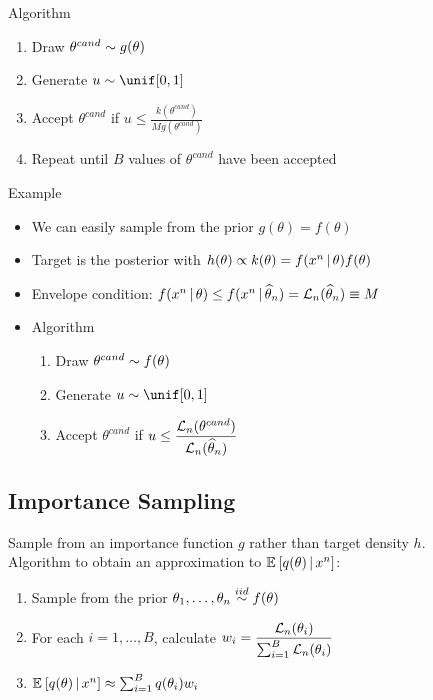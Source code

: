 \documentclass[landscape]{article}
\begin{document}
\begin{multicols*}{2}
Algorithm
\begin{enumerate}
  \item Draw $\theta^{cand} \sim g(\theta)$
  \item Generate $u \dist \unif[0,1]$
  \item Accept $\theta^{cand}$ if 
    $u \le \displaystyle\frac{k(\theta^{cand})}{Mg(\theta^{cand})}$
  \item Repeat until $B$ values of $\theta^{cand}$ have been accepted
\end{enumerate}

Example
\begin{itemize}
  \item We can easily sample from the prior $g(\theta) = f(\theta)$
  \item Target is the posterior with 
    $h(\theta) \propto k(\theta) = f(x^n\,|\, \theta) f(\theta)$
  \item Envelope condition:
    $f(x^n\,|\,\theta) \le f(x^n\,|\,\widehat{\theta}_n) = \mathcal{L}_n(\widehat{\theta}_n)\equiv M$
  \item Algorithm
    \begin{enumerate}
      \item Draw $\theta^{cand} \sim f(\theta)$
      \item Generate $u \dist \unif[0,1]$
      \item Accept $\theta^{cand}$ if 
        $u \le \displaystyle\frac{\mathcal{L}_n(\theta^{cand})}{\mathcal{L}_n(\widehat{\theta}_n)}$
    \end{enumerate}
\end{itemize}

\subsection{Importance Sampling}

Sample from an importance function $g$ rather than target density $h$.\\

Algorithm to obtain an approximation to $\mathbb{E}_{}\left[q(\theta)\,|\, x^n\right]$:
\begin{enumerate}
  \item Sample from the prior $\theta_1,\ldots,\theta_n \stackrel{iid}{\sim} f(\theta)$
  \item For each $i = 1,\ldots,B$, calculate 
    $w_i = \displaystyle\frac{\mathcal{L}_n(\theta_i)}{\sum_{i=1}^B \mathcal{L}_n(\theta_i)}$
  \item $\mathbb{E}_{}\left[q(\theta)\,|\, x^n\right] \approx \sum_{i=1}^B q(\theta_i)w_i$
\end{enumerate}


\end{multicols*}
\end{document}
